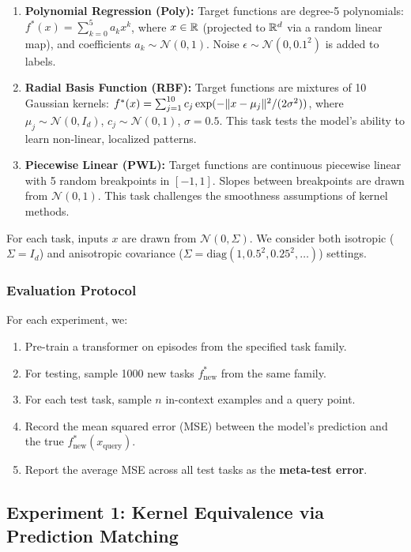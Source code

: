 	\begin{enumerate}
		\item \textbf{Polynomial Regression (Poly):} Target functions are degree-5 polynomials: \(f^*(x) = \sum_{k=0}^{5} a_k x^k\), where \(x \in \mathbb{R}\) (projected to \(\mathbb{R}^d\) via a random linear map), and coefficients \(a_k \sim \mathcal{N}(0, 1)\). Noise \(\epsilon \sim \mathcal{N}(0, 0.1^2)\) is added to labels.
		
		\item \textbf{Radial Basis Function (RBF):} Target functions are mixtures of 10 Gaussian kernels: \(f^*(x) = \sum_{j=1}^{10} c_j \exp(-\lVert x - \mu_j \rVert^2/(2\sigma^2))\), where \(\mu_j \sim \mathcal{N}(0, I_d)\), \(c_j \sim \mathcal{N}(0, 1)\), \(\sigma=0.5\). This task tests the model's ability to learn non-linear, localized patterns.
		
		\item \textbf{Piecewise Linear (PWL):} Target functions are continuous piecewise linear with 5 random breakpoints in \([-1, 1]\). Slopes between breakpoints are drawn from \(\mathcal{N}(0, 1)\). This task challenges the smoothness assumptions of kernel methods.
	\end{enumerate}
	
	For each task, inputs \(x\) are drawn from \(\mathcal{N}(0, \Sigma)\). We consider both isotropic (\(\Sigma = I_d\)) and anisotropic covariance (\(\Sigma = \text{diag}(1, 0.5^{2}, 0.25^{2}, \dots)\)) settings.
	
	\subsubsection{Evaluation Protocol}
	For each experiment, we:
	\begin{enumerate}
		\item Pre-train a transformer on episodes from the specified task family.
		\item For testing, sample 1000 new tasks \(f^*_{\text{new}}\) from the same family.
		\item For each test task, sample \(n\) in-context examples and a query point.
		\item Record the mean squared error (MSE) between the model's prediction and the true \(f^*_{\text{new}}(x_{\text{query}})\).
		\item Report the average MSE across all test tasks as the \textbf{meta-test error}.
	\end{enumerate}

	\subsection{Experiment 1: Kernel Equivalence via Prediction Matching}
\label{subsec:exp1}

